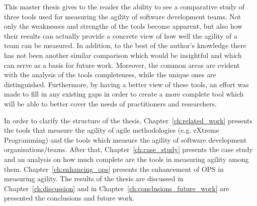This master thesis gives to the reader the ability to see a comparative study of three tools used for measuring the agility of software development teams. Not only the weaknesses and strengths of the tools become apparent, but also how their results can actually provide a concrete view of how well the agility of a team can be measured. In addition, to the best of the author's knowledge there has not been another similar comparison which would be insightful and which can serve as a basis for future work. Moreover, the common areas are evident with the analysis of the tools completeness, while the unique ones are distinguished. Furthermore, by having a better view of these tools, an effort was made to fill in any existing gaps in order to create a more complete tool which will be able to better cover the needs of practitioners and researchers.

In order to clarify the structure of the thesis,  Chapter~\ref{ch:related_work} presents the tools that measure the agility of agile methodologies (e.g. eXtreme Programming) and the tools which measure the agility of software development organisations/teams. After that, Chapter~\ref{ch:case_study} presents the case study and an analysis on how much complete are the tools in measuring agility among them. Chapter~\ref{ch:enhancing_ops} presents the enhancement of \ac{OPS} in measuring agility. The results of the thesis are discussed in Chapter~\ref{ch:discussion} and in Chapter~\ref{ch:conclusions_future_work} are presented the conclusions and future work. 



